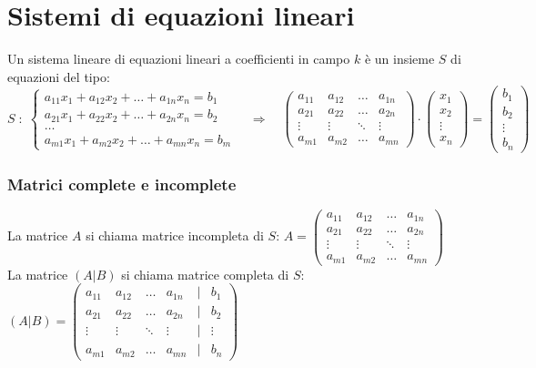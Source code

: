 \documentclass[a4paper]{article}
\begin{document}
\section{Sistemi di equazioni lineari}
Un sistema lineare di equazioni lineari a coefficienti in campo \(k\) è un insieme \(S\) di equazioni del tipo:
\[S \; : \; \begin{cases}
	a_{11} x_1 + a_{12} x_2 + \dots + a_{1n} x_n = b_1 \\
	a_{21} x_1 + a_{22} x_2 + \dots + a_{2n} x_n = b_2 \\
	\dots \\
	a_{m1} x_1 + a_{m2} x_2 + \dots + a_{mn} x_n = b_m
\end{cases} \quad \Rightarrow \quad
\begin{pmatrix}
	a_{11} & a_{12} & \dots & a_{1n} \\
	a_{21} & a_{22} & \dots & a_{2n} \\
	\vdots & \vdots & \ddots & \vdots \\
	a_{m1} & a_{m2} & \dots & a_{mn}
\end{pmatrix} \cdot
\begin{pmatrix} x_1 \\ x_2 \\ \vdots \\ x_n \end{pmatrix} =
\begin{pmatrix} b_1 \\ b_2 \\ \vdots \\ b_n \end{pmatrix}\]

\subsubsection*{Matrici complete e incomplete}
La matrice \(A\) si chiama matrice incompleta di \(S\): \(A = \begin{pmatrix}
	a_{11} & a_{12} & \dots & a_{1n} \\
	a_{21} & a_{22} & \dots & a_{2n} \\
	\vdots & \vdots & \ddots & \vdots \\
	a_{m1} & a_{m2} & \dots & a_{mn}
\end{pmatrix}\) \\
La matrice \((A|B)\) si chiama matrice completa di \(S\): \((A|B) = \begin{pmatrix}
	a_{11} & a_{12} & \dots & a_{1n} & | & b_1 \\
	a_{21} & a_{22} & \dots & a_{2n} & | & b_2 \\
	\vdots & \vdots & \ddots & \vdots & | & \vdots \\
	a_{m1} & a_{m2} & \dots & a_{mn} & | & b_n
\end{pmatrix}\)
\end{document}
